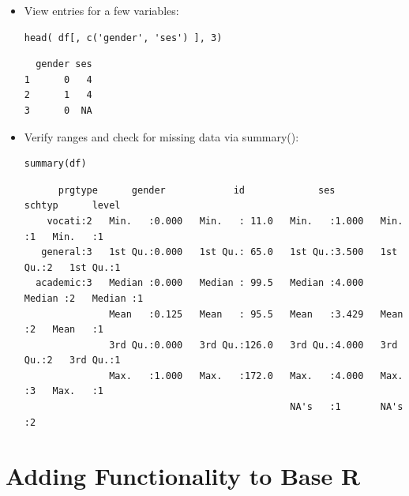 \begin{frame}
\begin{itemize}
{\tiny
\begin{verbatim}
[1] 0 1 0 0 0 0 # OR

  gender
1      0
2      1
3      0
4      0
5      0
6      0
7      0
8      0
\end{verbatim}	
}

\newpage	
		\item View entries for a few variables:
\begin{lstlisting}
head( df[, c('gender', 'ses') ], 3) 
\end{lstlisting}		

\begin{verbatim}
  gender ses
1      0   4
2      1   4
3      0  NA
\end{verbatim}

\newpage
		\item Verify ranges and check for missing data via \ttfamily summary(): \normalfont 
\begin{lstlisting}
summary(df)
\end{lstlisting}

{ \tiny
	\begin{verbatim}
      prgtype      gender            id             ses            schtyp      level  
    vocati:2   Min.   :0.000   Min.   : 11.0   Min.   :1.000   Min.   :1   Min.   :1  
   general:3   1st Qu.:0.000   1st Qu.: 65.0   1st Qu.:3.500   1st Qu.:2   1st Qu.:1  
  academic:3   Median :0.000   Median : 99.5   Median :4.000   Median :2   Median :1  
               Mean   :0.125   Mean   : 95.5   Mean   :3.429   Mean   :2   Mean   :1  
               3rd Qu.:0.000   3rd Qu.:126.0   3rd Qu.:4.000   3rd Qu.:2   3rd Qu.:1  
               Max.   :1.000   Max.   :172.0   Max.   :4.000   Max.   :3   Max.   :1  
                                               NA's   :1       NA's   :2              
	\end{verbatim}	
}
	\end{itemize}
\end{frame}


\section{Adding Functionality to Base R}

